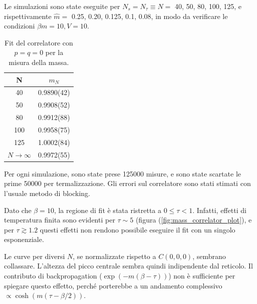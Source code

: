 \documentclass[a4paper,11pt]{article}
\begin{document}
    Le simulazioni sono state eseguite per $N_s = N_\tau \equiv N =$ 40, 50, 80, 100, 125, e rispettivamente $\hat{m} = $ 0.25, 0.20, 0.125, 0.1, 0.08, in modo da verificare le condizioni $\beta m = 10, V=10$.
    
    \begin{table}
        \begin{tabular}{c c} \hline
        N & $m_N$ \\ \hline
        40 &    0.9890(42)  \\
        50 &    0.9908(52)   \\
        80 &    0.9912(88)  \\
        100 &   0.9958(75)  \\
        125 &   1.0002(84)  \\ \hline
        $N \to \infty$ & 0.9972(55)  \\ \hline
        \end{tabular}
    \caption{Fit del correlatore con $p = q = 0$ per la misura della massa.}
    \label{tab:mass_fit}
    \end{table}
    

    
    Per ogni simulazione, sono state prese 125000 misure, e sono state scartate le prime 50000 per termalizzazione. Gli errori sul correlatore sono stati stimati con l'usuale metodo di blocking.
    
    
    Dato che $\beta = 10$, la regione di fit è stata ristretta a $0 \leq \tau < 1$. Infatti, effetti di temperatura finita sono evidenti per $\tau \sim 5$ (figura (\ref{fig:mass_correlator_plot}), e per $\tau \gtrsim 1.2$ questi effetti non rendono possibile eseguire il fit con un singolo esponenziale.

    
    Le curve per diversi $N$, se normalizzate rispetto a $C(0, 0, 0)$, sembrano collassare. L'altezza del picco centrale sembra quindi indipendente dal reticolo. Il contributo di backpropagation ($\exp (-m (\beta - \tau))$) non è sufficiente per spiegare questo effetto, perché porterebbe a un andamento complessivo $\propto \cosh (m(\tau - \beta/2))$. 
   
\end{document}
